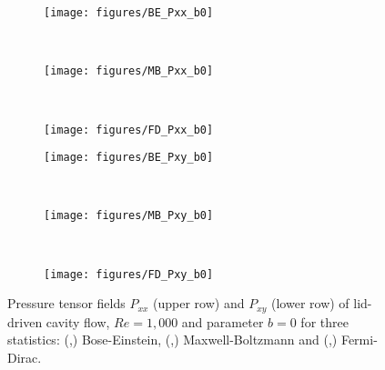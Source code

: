 \documentclass[aip,jmp,amsmath,amssymb,reprint,noshowpacs]{revtex4-1}
\begin{document}
\begin{figure*}[ht]
\centering
        \begin{subfigure}[b]{0.3\textwidth}
                \centering
                \texttt{[image: figures/BE\_Pxx\_b0]}
                \caption{ }
                \label{fig:BE_Pxx_b0}
        \end{subfigure}%
				~
				\begin{subfigure}[b]{0.3\textwidth}
                \centering
                \texttt{[image: figures/MB\_Pxx\_b0]}
                \caption{ }
                \label{fig:MB_Pxx_b0}
        \end{subfigure}%
				~
				\begin{subfigure}[b]{0.3\textwidth}
                \centering
                \texttt{[image: figures/FD\_Pxx\_b0]}
                \caption{ }
                \label{fig:FD_Pxx_b0}
        \end{subfigure}%
				
				\begin{subfigure}[b]{0.3\textwidth}
                \centering
                \texttt{[image: figures/BE\_Pxy\_b0]}
                \caption{ }
                \label{fig:BE_Pxy_b0}
        \end{subfigure}%
				~
				\begin{subfigure}[b]{0.3\textwidth}
                \centering
                \texttt{[image: figures/MB\_Pxy\_b0]}
                \caption{ }
                \label{fig:MB_Pxy_b0}
        \end{subfigure}%
				~
				\begin{subfigure}[b]{0.3\textwidth}
                \centering
                \texttt{[image: figures/FD\_Pxy\_b0]}
                \caption{ }
                \label{fig:FD_Pxy_b0}
        \end{subfigure}%
	\caption{Pressure tensor fields $P_{xx}$ (upper row) and $P_{xy}$ (lower row) of lid-driven cavity flow, $Re=1,000$ and parameter $b=0$ for three statistics:
	(,) Bose-Einstein, (,) Maxwell-Boltzmann and
 	(,) Fermi-Dirac.}
	\label{fig:Pressure_Tensor_b0}
\end{figure*}
\end{document}

